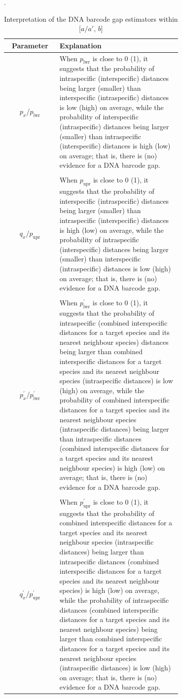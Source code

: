 \documentclass[12pt]{article}
\begin{document}
\begin{table}[htbp]
    \centering
    \small
    \caption{Interpretation of the DNA barcode gap estimators within [$a/a'$, $b$]}.
    \label{tab:parameters}
    \begin{tabular}{cp{0.7\linewidth}}
    \hline
    \textbf{Parameter} & \textbf{Explanation} \\
    \hline
    $p_x$/$p_{\text{lwr}}$ & When $p_{\text{lwr}}$ is close to 0 (1), it suggests that the probability of intraspecific (interspecific) distances being larger (smaller) than interspecific (intraspecific) distances is low (high) on average, while the probability of interspecific (intraspecific) distances being larger (smaller)  than intraspecific (interspecific) distances is high (low) on average; that is, there is (no) evidence for a DNA barcode gap.\\
        & \\[-2mm]
     $q_x$/$p_{\text{upr}}$ & When $p_{\text{upr}}$ is close to 0 (1), it suggests that the probability of interspecific (intraspecific) distances being larger (smaller) than intraspecific (interspecific) distances is high (low) on average, while the probability of intraspecific (interspecific) distances being larger (smaller) than interspecific (intraspecific) distances is low (high) on average; that is, there is (no) evidence for a DNA barcode gap. \\
        & \\[-2mm]
    $p^{'}_x$/$p^{'}_{\text{lwr}}$ & When $p^{'}_{\text{lwr}}$ is close to 0 (1), it suggests that the probability of intraspecific (combined interspecific distances for a target species and its nearest neighbour species) distances being larger than combined interspecific distances for a target species and its nearest neighbour species (intraspecific distances) is low (high) on average, while the probability of combined interspecific distances for a target species and its nearest neighbour species (intraspecific distances) being larger than intraspecific distances (combined interspecific distances for a target species and its nearest neighbour species) is high (low) on average; that is, there is (no) evidence for a DNA barcode gap.\\
        & \\[-2mm]
     $q^{'}_x$/$p^{'}_{\text{upr}}$ & When $p^{'}_{\text{upr}}$ is close to 0 (1), it suggests that the probability of combined interspecific distances for a target species and its nearest neighbour species (intraspecific distances) being larger than intraspecific distances (combined interspecific distances for a target species and its nearest neighbour species) is high (low) on average, while the probability of intraspecific distances (combined interspecific distances for a target species and its nearest neighbour species) being larger than combined interspecific distances for a target species and its nearest neighbour species (intraspecific distances) is low (high) on average; that is, there is (no) evidence for a DNA barcode gap.\\
    \hline
    \end{tabular}
\end{table}
\end{document}
